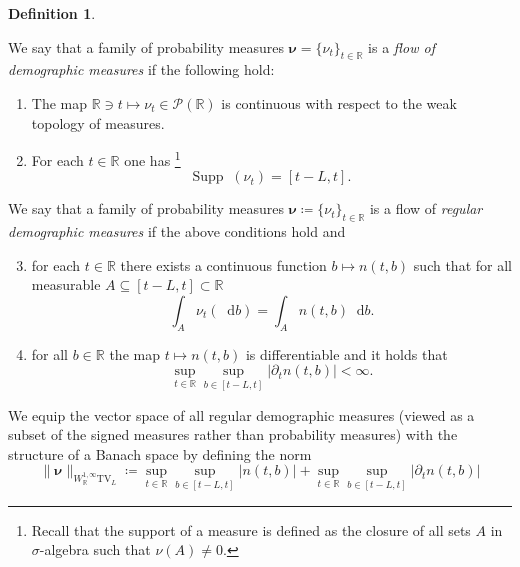 \documentclass[10pt,a4paper]{amsart}
\theoremstyle{plain}
\theoremstyle{plain}
\theoremstyle{definition}
\newtheorem{defn}{Definition}
\theoremstyle{remark}
\newcommand{\TV}{\text{TV}}
\newcommand{\bnu}{\boldsymbol{\nu}}
\newcommand{\dd}{\mathop{}\!\mathrm{d}}
\newcommand{\mbR}{\mathbb{R}}
\newcommand{\mcP}{\mathcal{P}}
\newcommand{\supp}{\text{Supp}\mathop{}\!}
\newcommand{\supp}{\text{Supp}\mathop{}\!}
\begin{document}
\begin{defn}\label{def:dem_flow}

    We say that a family of probability measures $\bnu = \{\nu_t\}_{t\in \mbR}$ is a \emph{flow of demographic measures} if the following hold:
    \begin{enumerate}[label=\roman*)]
        \item The map $\mbR \ni t\mapsto \nu_t \in \mcP(\mbR)$ is continuous with respect to the weak topology of measures.
        \item For each $t\in \mbR$ one has \footnote{Recall that the support of a measure is defined as the closure of all sets $A$ in $\sigma$-algebra such that $\nu(A)\neq 0$.
        }
        \begin{equation*}
            \supp(\nu_t) = [t-L,t].
        \end{equation*}
    \end{enumerate}
    We say that a family of probability measures $\bnu \coloneqq \{\nu_t\}_{t\in \mbR}$ is a flow of \emph{regular demographic measures} if the above conditions hold and
    \begin{enumerate}[label=\roman*)]
    \setcounter{enumi}{2}
        \item for each $t\in \mbR$ there exists a continuous function $b\mapsto n(t,b)$ such that for all measurable $A\subseteq [t-L,t]\subset \mbR$
        \begin{equation*}
            \int_A \nu_t(\dd b) = \int_A  n(t,b)\dd b.
        \end{equation*}
\item for all $b\in \mbR$ the map $t\mapsto n(t,b)$ is differentiable and it holds that
%
\begin{equation*}
    \sup_{t\in \mbR}\sup_{b\in [t-L,t]} |\partial_t n(t,b)|  <\infty.
\end{equation*}
    \end{enumerate}
    We equip the vector space of all regular demographic measures (viewed as a subset of the signed measures rather than probability measures) with the structure of a Banach space by defining the norm 
    \begin{equation}\label{eq:demography_norm}
        \|\bnu\|_{W^{1,\infty}_{\mbR} \TV_L } \coloneqq \sup_{t\in \mbR} \sup_{b\in [t-L,t]} |n(t,b)| + \sup_{t\in \mbR} \sup_{b\in [t-L,t]} |\partial_t n(t,b)|
    \end{equation}
\end{defn}
\end{document}
